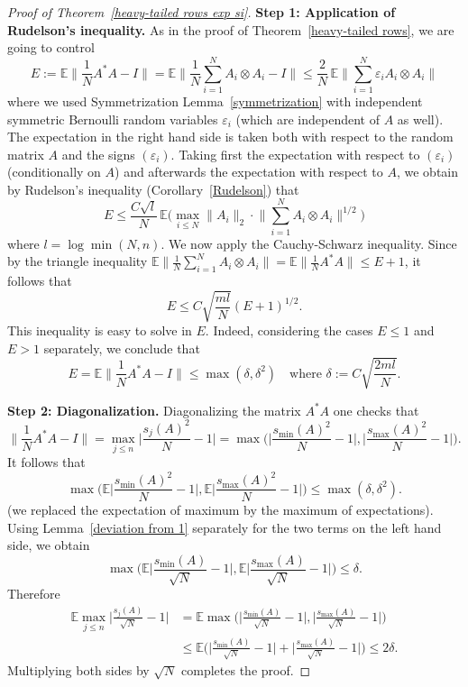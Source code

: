 \documentclass[10pt, openany]{book}
\theoremstyle{remark}
\def \E {\mathbb{E}}
\def \e {\varepsilon}
\def \d {\delta}
\def \smin {s_{\min}}
\def \smax {s_{\max}}
\begin{document}
\begin{proof}[Proof of Theorem~\ref{heavy-tailed rows exp si}]
{\bf Step 1: Application of Rudelson's inequality.} 
As in the proof of Theorem~\ref{heavy-tailed rows}, we are going to control
$$
E := \E \big\| \frac{1}{N} A^*A - I \big\| 
= \E \Big\| \frac{1}{N} \sum_{i=1}^N A_i \otimes A_i - I \Big\|
\le  \frac{2}{N} \, \E \Big\| \sum_{i=1}^N \e_i A_i \otimes A_i \Big\|
$$
where we used Symmetrization Lemma~\ref{symmetrization}
with independent symmetric Bernoulli random variables $\e_i$ 
(which are independent of $A$ as well). The expectation in the right hand side is taken both with respect 
to the random matrix $A$ and the signs $(\e_i)$. Taking first the expectation with respect to $(\e_i)$
(conditionally on $A$) and afterwards the expectation with respect to $A$,
we obtain by Rudelson's inequality (Corollary~\ref{Rudelson}) that
$$
E \le \frac{C \sqrt{l}}{N} \, 
  \E \Big( \max_{i \le N} \|A_i\|_2 \cdot \Big\| \sum_{i=1}^N A_i \otimes A_i \Big\|^{1/2} \Big)
$$
where $l = \log \min(N,n)$.
We now apply the Cauchy-Schwarz inequality. Since by the triangle inequality 
$\E \big\| \frac{1}{N} \sum_{i=1}^N A_i \otimes A_i \big\| = \E \big\| \frac{1}{N} A^*A \big\| \le E + 1$,
it follows that
$$
E \le C \sqrt{\frac{ml}{N}} (E+1)^{1/2}.
$$
This inequality is easy to solve in $E$. Indeed, 
considering the cases $E \le 1$ and $E > 1$ separately, we conclude that
$$
E = \E \big\| \frac{1}{N} A^*A - I \big\| \le \max(\d, \d^2)
\quad \text{where } \d := C \sqrt{\frac{2ml}{N}}.
$$

{\bf Step 2: Diagonalization.}
Diagonalizing the matrix $A^*A$ one checks that 
$$
\big\| \frac{1}{N} A^*A - I \big\|
= \max_{j \le n} \big| \frac{s_j(A)^2}{N} - 1 \big|
= \max \Big( \big| \frac{\smin(A)^2}{N} - 1 \big|,
  \big| \frac{\smax(A)^2}{N} - 1 \big| \Big).
$$
It follows that
$$
\max \Big( \E \big| \frac{\smin(A)^2}{N} - 1 \big|,
  \E \big| \frac{\smax(A)^2}{N} - 1 \big| \Big)
\le \max(\d,\d^2).
$$
(we replaced the expectation of maximum by the maximum of expectations). 
Using Lemma~\ref{deviation from 1} separately for the two terms on the left hand side, we obtain
$$
\max \Big( \E \big| \frac{\smin(A)}{\sqrt{N}} - 1 \big|,
  \E \big| \frac{\smax(A)}{\sqrt{N}} - 1 \big| \Big)
\le \d.
$$
Therefore 
\begin{align*}
\E \max_{j \le n} \big| \frac{s_j(A)}{\sqrt{N}}-1 \big|
&= \E \max \Big( \big| \frac{\smin(A)}{\sqrt{N}} - 1 \big|,
  \Big| \frac{\smax(A)}{\sqrt{N}} - 1 \Big| \Big) \\
&\le \E \Big( \big| \frac{\smin(A)}{\sqrt{N}} - 1 \big|
  + \big| \frac{\smax(A)}{\sqrt{N}} - 1 \big| \Big)
\le 2\d.
\end{align*}
Multiplying both sides by $\sqrt{N}$ completes the proof.
\end{proof}
\end{document}
